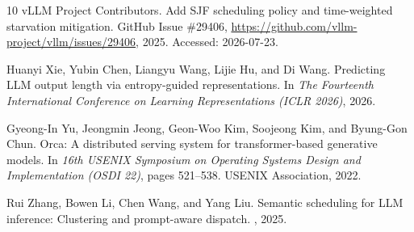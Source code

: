 \documentclass[10pt]{article}
\begin{document}
\begin{thebibliography}{10}
vLLM Project Contributors.
\newblock Add SJF scheduling policy and time-weighted starvation mitigation.
\newblock GitHub Issue \#29406, \url{https://github.com/vllm-project/vllm/issues/29406}, 2025. Accessed: 2026-07-23.

Huanyi Xie, Yubin Chen, Liangyu Wang, Lijie Hu, and Di Wang.
\newblock Predicting LLM output length via entropy-guided representations.
\newblock In {\em The Fourteenth International Conference on Learning Representations (ICLR 2026)}, 2026.

Gyeong-In Yu, Jeongmin Jeong, Geon-Woo Kim, Soojeong Kim, and Byung-Gon Chun.
\newblock Orca: A distributed serving system for transformer-based generative models.
\newblock In {\em 16th USENIX Symposium on Operating Systems Design and Implementation (OSDI 22)}, pages 521--538. USENIX Association, 2022.

Rui Zhang, Bowen Li, Chen Wang, and Yang Liu.
\newblock Semantic scheduling for LLM inference: Clustering and prompt-aware dispatch.
, 2025.

\end{thebibliography}
\end{document}
